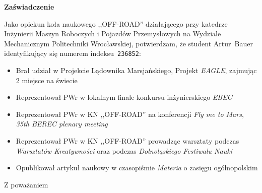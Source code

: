 \documentclass[11pt,a4paper]{letter} %
\date{Wrocław, \today}
\begin{document}
\begin{letter}{}
\opening{}

\begin{center}
  \huge
  \textbf{Zaświadczenie}
\end{center}

 Jako opiekun koła naukowego ,,OFF-ROAD'' działającego przy katedrze Inżynierii Maszyn Roboczych i Pojazdów Przemysłowych na Wydziale Mechanicznym Politechniki Wrocławskiej, potwierdzam, że student Artur~Bauer identyfikujący się numerem indeksu~\texttt{236852}:
\begin{itemize}
    \item Brał udział w Projekcie Lądownika Marsjańskiego, Projekt \textit{EAGLE}, zajmując 2 miejsce na świecie
    \item Reprezentował PWr w lokalnym finale konkursu inżynierskiego \textit{EBEC}
    \item Reprezentował PWr w KN ,,OFF-ROAD'' na konferencji \textit{Fly me to Mars}, \textit{35th BEREC plenary meeting}
    \item Reprezentował PWr w KN ,,OFF-ROAD'' prowadząc warsztaty podczas \textit{Warsztatów Kreatywności} oraz podczas \textit{Dolnoląskiego Festiwalu Nauki}
    \item Opublikował artykuł naukowy w czasopiśmie \textit{Materia} o zasięgu ogólnopolskim
\end{itemize}
\closing{Z poważaniem}

\end{letter}
\end{document}
